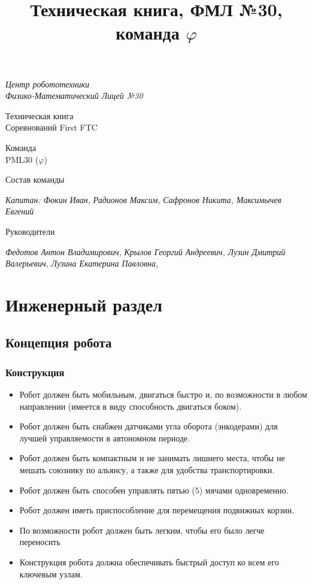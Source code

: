 \documentclass[12pt]{article}
\title{ Техническая книга, ФМЛ №30, команда ${\varphi}$}
\begin{document}
\thispagestyle{titlestyle}
		\begin{titlepage}
			\newpage
			
			\begin{center}
				\Large \textit{Центр робототехники\\
					Физико-Математический Лицей №30}
				
				\vspace{8em}
				
				\Large {Техническая книга\\
					Соревнований First FTC}
				
				\vspace{4em}
				
				Команда\\
				PML30 (${\varphi}$)
				
			\end{center}
			
		\end{titlepage}
		
		\newpage
        \large Состав команды
	\begin{flushleft}
		\emph{Капитан: Фокин Иван,}
		\emph{Радионов Максим,}
		\emph{Сафронов Никита,}
		\emph{Максимычев Евгений}
	\end{flushleft}
	\large Руководители
	\begin{flushleft}
		\emph{Федотов Антон Владимирович,}
		\emph{Крылов Георгий Андреевич,}
		\emph{Лузин Дмитрий Валерьевич,}
		\emph{Лузина Екатерина Павловна,}
	\end{flushleft}	
	
		
	\newpage
	\tableofcontents{}
	
	
	\newpage
	\section{Инженерный раздел}
	\subsection{Концепция робота}
	\subsubsection{Конструкция}
	\begin{itemize}
		\item Робот должен быть мобильным, двигаться быстро и, по возможности в любом направлении (имеется в виду способность двигаться боком).
		\item Робот должен быть снабжен датчиками угла оборота (энкодерами) для лучшей управляемости в автономном периоде.
		\item Робот должен быть компактным и не занимать лишнего места, чтобы не мешать союзнику по альянсу, а также для удобства транспортировки.
		\item Робот должен быть способен управлять пятью (5) мячами одновременно.
		\item Робот должен иметь приспособление для перемещения подвижных корзин.
		\item По возможности робот должен быть легким, чтобы его было легче переносить
		\item Конструкция робота должна обеспечивать быстрый доступ ко всем его ключевым узлам.
	\end{itemize}
\end{document}
